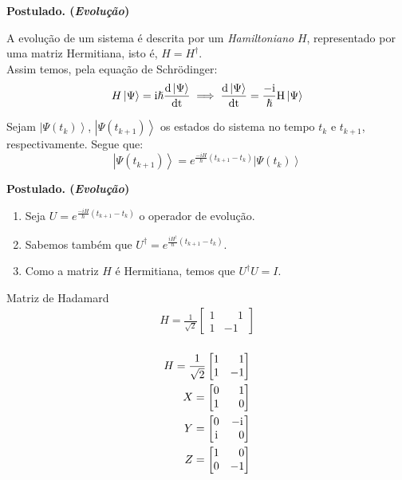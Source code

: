 \documentclass[t]{beamer}
\newcommand{\ii}{
	\rm{i}
}
\newcommand{\postulado}[1]{%
	\textbf{Postulado. (\emph{#1})\\}
}
\newcommand{\matriz}[4]{\ensuremath{
\left[\begin{matrix}
#1 & #2 \\
#3 & #4 
\end{matrix}\right]
}
}
\newcommand{\ket}[1]{\ensuremath{\left|#1\right\rangle}}
\newcommand{\ps}{
	\phantom{-}
}
\newcommand{\HH}{\ensuremath{
	\frac{1}{\sqrt{2}}\matriz{1}{\ps 1}{1}{-1}
}}
\newcommand{\XX}{\ensuremath{
	\matriz{0}{\ps 1}{1}{\ps 0}
}}
\newcommand{\YY}{\ensuremath{
	\matriz{0}{-\ii}{\ii}{\ps 0}
}}
\newcommand{\ZZ}{\ensuremath{
	\matriz{1}{\ps 0}{0}{-1}
}}
\begin{document}
	\begin{frame}{\subsecname}
		\postulado{Evolução}
		A evolução de um sistema é descrita por um \textit{Hamiltoniano} $H$, representado por uma matriz Hermitiana, isto é, $H = H^{\dagger}$.\\
		
		Assim temos, pela equação de Schrödinger:
		$$H \ket{\Psi} =\ii \hslash \frac{d \ket{\Psi}}{dt} \implies \frac{d \ket{\Psi}}{dt} = \frac{-\ii}{\hslash} H \ket{\Psi}$$
		
		Sejam $\ket{\Psi(t_k)}$, $\ket{\Psi(t_{k+1})}$ os estados do sistema no tempo $t_k$ e $t_{k+1}$, respectivamente. Segue que:
		$$\ket{\Psi(t_{k+1})} = e^{\frac{-i H}{\hslash} (t_{k+1} - t_k)} \ket{\Psi(t_k)}$$
	\end{frame}
	
	\begin{frame}{\subsecname}
		\postulado{Evolução}
		\begin{enumerate}
			\item<1-> Seja $U = e^{\frac{-i H}{\hslash} (t_{k+1} - t_k)}$ o operador de evolução.
			\item<2-> Sabemos também que $U^{\dagger} = e^{\frac{i H^{\dagger}}{\hslash} (t_{k+1} - t_k)}$.
			\item<3-> Como a matriz $H$ é Hermitiana, temos que $U^{\dagger} U = I$.
		\end{enumerate}
		
	 \bigskip

	\vspace{1 cm}
	
	
	\end{frame}
	
	\begin{frame}{\subsecname}
		Matriz de Hadamard
		\begin{align*}
			H = \HH\\
		\end{align*}
	\end{frame}
	
	\begin{frame}{\subsecname}
		\begin{align*}
			H = \HH\\
			X = \XX\\
			Y = \YY\\
			Z = \ZZ
		\end{align*}
	\end{frame}
	
\end{document}
